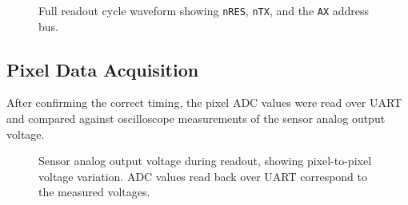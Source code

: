\begin{figure}[htbp]
  \centering
  \caption{Full readout cycle waveform showing \texttt{nRES},
    \texttt{nTX}, and the \texttt{AX} address bus.}
  \label{fig:readout_full}
\end{figure}


\subsection{Pixel Data Acquisition}

After confirming the correct timing, the pixel ADC values were read over UART and compared against oscilloscope measurements of the sensor analog output voltage.

\begin{figure}[h]
  \centering
  \caption{Sensor analog output voltage during readout, showing
    pixel-to-pixel voltage variation. ADC values read back over UART correspond to the measured voltages.}
  \label{fig:pixel_values}
\end{figure}

